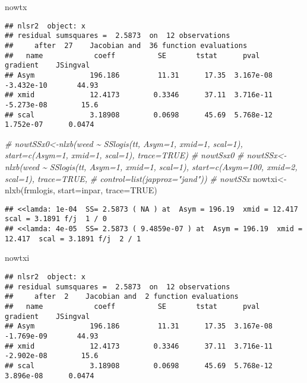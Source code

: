 \documentclass[
]{article}
\newenvironment{Shaded}{\begin{snugshade}}{\end{snugshade}}
\newcommand{\AttributeTok}[1]{\textcolor[rgb]{0.77,0.63,0.00}{#1}}
\newcommand{\CommentTok}[1]{\textcolor[rgb]{0.56,0.35,0.01}{\textit{#1}}}
\newcommand{\ConstantTok}[1]{\textcolor[rgb]{0.00,0.00,0.00}{#1}}
\newcommand{\FunctionTok}[1]{\textcolor[rgb]{0.00,0.00,0.00}{#1}}
\newcommand{\NormalTok}[1]{#1}
\newcommand{\OtherTok}[1]{\textcolor[rgb]{0.56,0.35,0.01}{#1}}
\begin{document}
\begin{Shaded}
\begin{Highlighting}[]
\NormalTok{nowtx}
\end{Highlighting}
\end{Shaded}

\begin{verbatim}
## nlsr2  object: x 
## residual sumsquares =  2.5873  on  12 observations
##     after  27    Jacobian and  36 function evaluations
##   name            coeff          SE       tstat      pval      gradient    JSingval   
## Asym             196.186         11.31      17.35  3.167e-08  -3.432e-10       44.93  
## xmid             12.4173        0.3346      37.11  3.716e-11  -5.273e-08        15.6  
## scal             3.18908        0.0698      45.69  5.768e-12   1.752e-07      0.0474
\end{verbatim}

\begin{Shaded}
\begin{Highlighting}[]
\CommentTok{\# nowtSSx0\textless{}{-}nlxb(weed \textasciitilde{} SSlogis(tt, Asym=1, xmid=1, scal=1), start=c(Asym=1, xmid=1, scal=1), trace=TRUE)}
\CommentTok{\# nowtSsx0}
\CommentTok{\# nowtSSx\textless{}{-}nlxb(weed \textasciitilde{} SSlogis(tt, Asym=1, xmid=1, scal=1), start=c(Asym=100, xmid=2, scal=1), trace=TRUE, }
\CommentTok{\#               control=list(japprox="jand"))}
\CommentTok{\# nowtSSx}
\NormalTok{nowtxi}\OtherTok{\textless{}{-}}\FunctionTok{nlxb}\NormalTok{(frmlogis, }\AttributeTok{start=}\NormalTok{inpar, }\AttributeTok{trace=}\ConstantTok{TRUE}\NormalTok{)}
\end{Highlighting}
\end{Shaded}

\begin{verbatim}
## <<lamda: 1e-04  SS= 2.5873 ( NA ) at  Asym = 196.19  xmid = 12.417  scal = 3.1891 f/j  1 / 0
## <<lamda: 4e-05  SS= 2.5873 ( 9.4859e-07 ) at  Asym = 196.19  xmid = 12.417  scal = 3.1891 f/j  2 / 1
\end{verbatim}

\begin{Shaded}
\begin{Highlighting}[]
\NormalTok{nowtxi}
\end{Highlighting}
\end{Shaded}

\begin{verbatim}
## nlsr2  object: x 
## residual sumsquares =  2.5873  on  12 observations
##     after  2    Jacobian and  2 function evaluations
##   name            coeff          SE       tstat      pval      gradient    JSingval   
## Asym             196.186         11.31      17.35  3.167e-08  -1.769e-09       44.93  
## xmid             12.4173        0.3346      37.11  3.716e-11  -2.902e-08        15.6  
## scal             3.18908        0.0698      45.69  5.768e-12   3.896e-08      0.0474
\end{verbatim}
\end{document}
